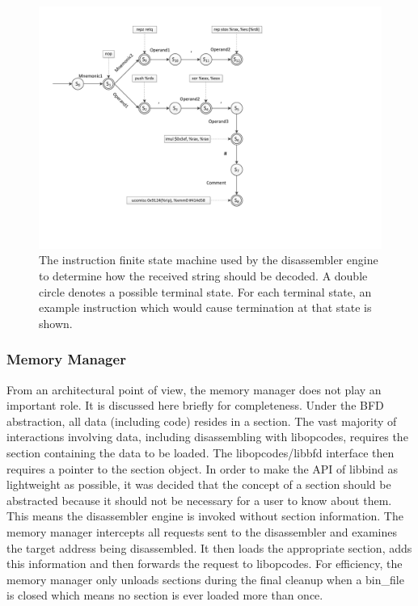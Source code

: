 \begin{figure}[H]
 \centering
 \includegraphics[scale=0.9]{Instruction_State_Machine.pdf}
 \caption[Hierarchy]{The instruction finite state machine used by the disassembler engine to determine how the received string should be decoded. A double circle denotes a possible terminal state. For each terminal state, an example instruction which would cause termination at that state is shown.}
\label{fig:Instruction_State_Machine}
\end{figure}

\subsubsection{Memory Manager}

From an architectural point of view, the memory manager does not play an important role. It is discussed here briefly for completeness. Under the BFD abstraction, all data (including code) resides in a section. The vast majority of interactions involving data, including disassembling with libopcodes, requires the section containing the data to be loaded. The libopcodes/libbfd interface then requires a pointer to the section object. In order to make the API of libbind as lightweight as possible, it was decided that the concept of a section should be abstracted because it should not be necessary for a user to know about them. This means the disassembler engine is invoked without section information. The memory manager intercepts all requests sent to the disassembler and examines the target address being disassembled. It then loads the appropriate section, adds this information and then forwards the request to libopcodes. For efficiency, the memory manager only unloads sections during the final cleanup when a bin\_file is closed which means no section is ever loaded more than once.

